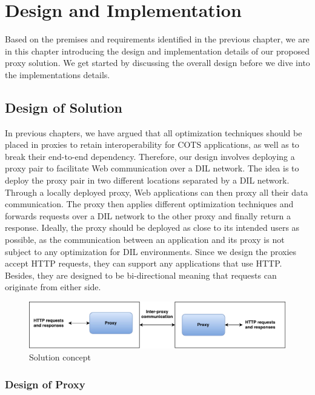 \chapter{Design and Implementation}
\label{chapter:design}

Based on the premises and requirements identified in the previous chapter, we
are in this chapter introducing the design and implementation details of our
proposed proxy solution. We get started by discussing the overall design before
we dive into the implementations details.

\section{Design of Solution}

In previous chapters, we have argued that all optimization techniques should be
placed in proxies to retain interoperability for COTS applications, as well as
to break their end-to-end dependency. Therefore, our design involves deploying a
proxy pair to facilitate Web communication over a DIL network. The idea is to
deploy the proxy pair in two different locations separated by a DIL network.
Through a locally deployed proxy, Web applications can then proxy all their data
communication. The proxy then applies different optimization techniques and
forwards requests over a DIL network to the other proxy and finally return a
response. Ideally, the proxy should be deployed as close to its intended users
as possible, as the communication between an application and its proxy is not
subject to any optimization for DIL environments. Since we design the proxies
accept HTTP requests, they can support any applications that use HTTP. Besides,
they are designed to be bi-directional meaning that requests can originate from
either side.

\begin{figure}[h]
\includegraphics[scale=0.55]{images/proxy_design.pdf}
\caption{Solution concept}
\label{figure:proxy_design}
\end{figure}


\subsection{Design of Proxy}

